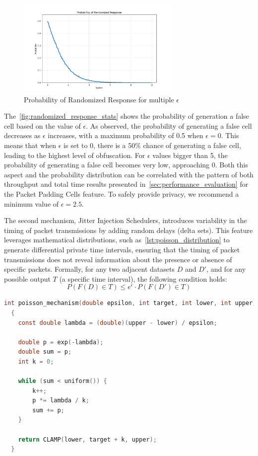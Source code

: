 \begin{figure}
    \centering
    \includegraphics[width=0.7\textwidth]{Chapters/Figures/Plots/rr_stats.png}
    \caption{Probability of Randomized Response for multiple $\epsilon$}\label{fig:randomized_response_stats}
\end{figure}

The~\autoref{fig:randomized_response_stats} shows the probability of generation a false cell based on the value of $\epsilon$. As observed, the probability of generating a false cell decreases as $\epsilon$ increases, with a maximum probability of 0.5 when $\epsilon = 0$. This means that when $\epsilon$ is set to 0, there is a 50\% chance of generating a false cell, leading to the highest level of obfuscation. For $\epsilon$ values bigger than 5, the probability of generating a false cell becomes very low, approaching 0. Both this aspect and the probability distribution can be correlated with the pattern of both throughput and total time results presented in~\autoref{sec:performance_evaluation} for the Packet Padding Cells feature. To safely provide privacy, we recommend a minimum value of $\epsilon = 2.5$.


The second mechanism, Jitter Injection Schedulers, introduces variability in the timing of packet transmissions by adding random delays (delta sets). This feature leverages mathematical distributions, such as~\autoref{lst:poisson_distribution} to generate differential private time intervals, ensuring that the timing of packet transmissions does not reveal information about the presence or absence of specific packets. Formally, for any two adjacent datasets $D$ and $D'$, and for any possible output $T$ (a specific time interval), the following condition holds:
\[P(F(D) \in T) \leq e^{\epsilon} \cdot P(F(D') \in T)\]

\begin{lstlisting}[language=C, caption={Poisson Distribution Pseudo-Random Number Generator implementation.}, label={lst:poisson_distribution}]
  int poisson_mechanism(double epsilon, int target, int lower, int upper)
  {
    const double lambda = (double)(upper - lower) / epsilon;

    double p = exp(-lambda);
    double sum = p;
    int k = 0;

    while (sum < uniform()) {
        k++;
        p *= lambda / k;
        sum += p;
    }

    return CLAMP(lower, target + k, upper);
  }
\end{lstlisting}

